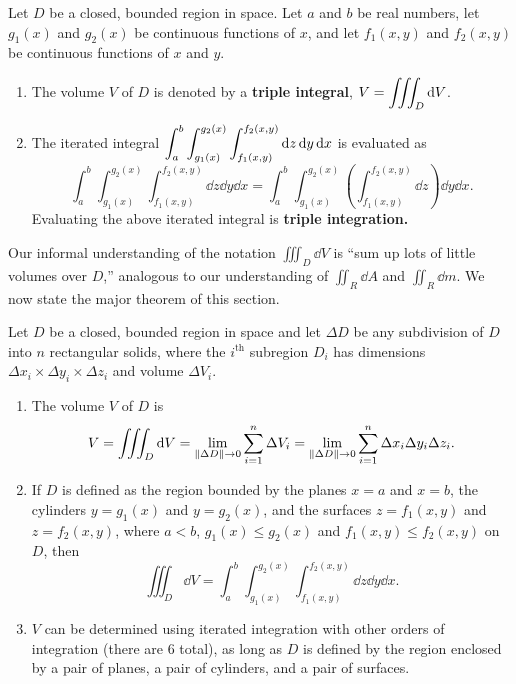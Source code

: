 {
\begin{definition}\label{def:triple_integral}%
Let $D$ be a closed, bounded region in space. Let $a$ and $b$ be real numbers, let $g_1(x)$ and $g_2(x)$ be continuous functions of $x$, and let $f_1(x,y)$ and $f_2(x,y)$ be continuous functions of $x$ and $y$.
\begin{enumerate}
	\item	The volume $V$ of $D$ is denoted by a \textbf{triple integral},
	$\displaystyle V = \iiint_D\operatorname{d}\! V$.
	
	\item The iterated integral $\displaystyle \int_a^b\int_{g_1(x)}^{g_2(x)}\int_{f_1(x,y)}^{f_2(x,y)} \operatorname{d}\! z\operatorname{d}\! y\operatorname{d}\! x$ is evaluated as 
	\[\int_a^b\int_{g_1(x)}^{g_2(x)}\int_{f_1(x,y)}^{f_2(x,y)} \dd z\dd y\dd x=\int_a^b\int_{g_1(x)}^{g_2(x)}\left(\int_{f_1(x,y)}^{f_2(x,y)} \dd z\right)\dd y\dd x.\]
	Evaluating the above iterated integral is \textbf{triple integration.}
\end{enumerate}
\end{definition}
}

Our informal understanding of the notation $\iiint_D\dd V$ is ``sum up lots of little volumes over $D$,'' analogous to our understanding of $\iint_R\dd A$ and $\iint_R\dd m$. We now state the major theorem of this section.

{
\begin{theorem}\label{thm:triple_integration}%
Let $D$ be a closed, bounded region in space and let $\Delta D$ be any subdivision of $D$ into $n$ rectangular solids, where the  $i^{\text{th}}$ subregion $D_i$ has dimensions $\Delta x_i\times\Delta y_i\times\Delta z_i$ and volume $\Delta V_i$.
\begin{enumerate}
	\item	The volume $V$ of $D$ is
	\[V = \iiint_D\operatorname{d}\! V = \lim_{\left\lVert \Delta D \right\rVert\to0} \sum_{i=1}^n \Delta V_i = \lim_{\left\lVert \Delta D \right\rVert\to0} \sum_{i=1}^n \Delta x_i\Delta y_i\Delta z_i.\]

	\item	If $D$ is defined as the region bounded by the planes $x=a$ and $x=b$, the cylinders $y=g_1(x)$ and $y=g_2(x)$, and the surfaces $z=f_1(x,y)$ and $z=f_2(x,y)$, where $a<b$, $g_1(x)\leq g_2(x)$ and $f_1(x,y)\leq f_2(x,y)$ on $D$, then
	\[\iiint_D \dd V = \int_a^b\int_{g_1(x)}^{g_2(x)}\int_{f_1(x,y)}^{f_2(x,y)} \dd z\dd y\dd x.\]

	\item	$V$ can be determined using iterated integration with other orders of integration (there are 6 total), as long as $D$ is defined by the region enclosed by a pair of planes, a pair of cylinders, and a pair of surfaces.
\end{enumerate}
\end{theorem}
}


